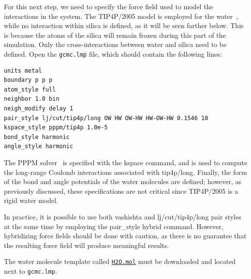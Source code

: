 \documentclass[9pt,tutorial]{livecoms}
\newcommand{\lmpcmd}[1]{\colorbox{listing}{\textcolor{command}{\small{#1}}}} %
\newcommand{\flecmd}[1]{\textcolor{command}{\texttt{#1}}} %
\newcommand{\dwlcmd}[1]{\textcolor{download}{\texttt{#1}}} %
\newcommand{\filepath}{https://raw.githubusercontent.com/lammpstutorials/lammpstutorials-article/main/files/}
\begin{document}
For this next step, we need to specify the force field used
to model the interactions in the system. The TIP4P/2005 model is employed
for the water~\cite{abascal2005general}, while no interaction
within silica is defined, as it will be seen farther below.
This is because the atoms of the silica will
remain frozen during this part of the simulation.
Only the cross-interactions between water and silica need
to be defined. Open the \flecmd{gcmc.lmp} file, which should contain the following lines:
\begin{lstlisting}
units metal
boundary p p p
atom_style full
neighbor 1.0 bin
neigh_modify delay 1
pair_style lj/cut/tip4p/long OW HW OW-HW HW-OW-HW 0.1546 10
kspace_style pppm/tip4p 1.0e-5
bond_style harmonic
angle_style harmonic
\end{lstlisting}
The PPPM solver~\cite{luty1996calculating} is specified with the \lmpcmd{kspace}
command, and is used to compute the long-range Coulomb interactions associated
with \lmpcmd{tip4p/long}.  Finally, the form of the bond
and angle potentials of the water molecules are defined; however,
as previously discussed, these specifications are
not critical since TIP4P/2005 is a rigid water model.

\begin{note}
  In practice, it is possible to use both \lmpcmd{vashishta} and
  \lmpcmd{lj/cut/tip4p/long} pair styles at the same time by employing the
  \lmpcmd{pair\_style hybrid}
  command.  However, hybridizing force fields should be done with caution, as there
  is no guarantee that the resulting force field will produce meaningful results.
\end{note}

The water molecule template called \href{\filepath tutorial6/H2O.mol}{\dwlcmd{H2O.mol}}
must be downloaded and located next to \flecmd{gcmc.lmp}.
\end{document}
